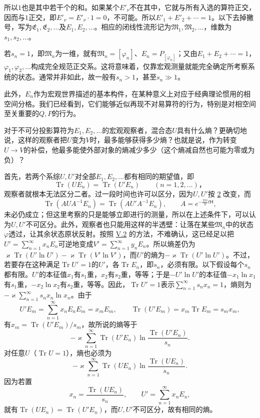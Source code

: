 \documentclass[fontsize=13pt,twoside,openany,headings=normal,parskip=false,bookmarkpackage=false,DIV=calc]{scrbook}
\begin{document}
所以$1$也是其中若干个的和。如果某个$E'_\nu$不在其中，它就与所有入选的算符正交，因而与$1$正交，即$E'_\nu=E'_\nu\cdot1=0$，不可能。所以$E'_1+E'_2+\cdots=1$。以下去掉撇号，写为$\mathfrak E_1,\allowbreak \mathfrak E_2,\allowbreak \ldots$及$E_1,\allowbreak E_2,\allowbreak \ldots$。相应的闭线性流形记为$\mathfrak M_1,\allowbreak \mathfrak M_2,\allowbreak \ldots$，维数为$s_1,\allowbreak s_2,\allowbreak \ldots$。

若$s_n=1$，即$\mathfrak M_n$为一维，就有$\mathfrak M_n=[\varphi_n]$、$E_n=P_{[\varphi_n]}$；又由$E_1+E_2+\cdots=1$，$\varphi_1,\allowbreak \varphi_2,\allowbreak \ldots$构成完全规范正交系。这将意味着，仅靠宏观测量就能完全确定所考察系统的状态。通常并非如此，故一般有$s_n>1$，甚至$s_n\gg1$。

此外，$E_n$作为宏观世界描述的基本构件，在某种\hypertarget{origpage-219}{}\label{origpage-219}意义上对应于经典理论惯用的相空间分格。我们已经看到，它们能够近似再现不对易算符的行为，特别是对相空间至关重要的$Q,\allowbreak P$的行为。

对于不可分投影算符为$E_1,\allowbreak E_2,\allowbreak \ldots$的宏观观察者，混合态$U$具有什么熵？更确切地说，这样的观察者把$U$变为$V$时，最多能够获得多少熵？也就是说，作为转变$U\to V$的补偿，他最多能使外部对象的熵减少多少（这个熵减自然也可能为零或为负）？

首先，若两个系综$U,\allowbreak U'$对全部$E_1,\allowbreak E_2,\allowbreak \ldots$都有相同的期望值，即
\[
\operatorname{Tr}(UE_n)=\operatorname{Tr}(U'E_n)\qquad(n=1,2,\ldots)\text{，}
\]
观察者就根本无法区分二者。过一段时间也许可以区分，因为$U,\allowbreak U'$按 \hyperref[eq:V.1.2]{2} 改变，而
\[
\operatorname{Tr}(AUA^{-1}E_n)=\operatorname{Tr}(AU'A^{-1}E_n),\qquad
A=e^{-\frac{2\pi i}{h}t\mathsf{H}},
\]
未必仍成立；但这里考察的只是能够立即进行的测量，所以在上述条件下，可以认为$U,\allowbreak U'$不可区分。此外，观察者也只能用这样的半透壁：让落在某些$\mathfrak M_n$中的状态$\varphi$透过，让其余状态原状反射。按照 \hyperref[sec:V.2]{V.2} 的方法，不难确认，这已经足以把$U'=\sum_{n=1}^{\infty}x_nE_n$可逆地变成$V'=\sum_{n=1}^{\infty}y_nE_n$。所以熵差仍为$\varkappa\operatorname{Tr}(U'\ln U')-\varkappa\operatorname{Tr}(V'\ln V')$，而$U'$的熵为$-\varkappa\operatorname{Tr}(U'\ln U')$。不过，若要存在这种满足$\operatorname{Tr}U'=1$的$U'$，各$\operatorname{Tr}E_n$，即$s_n$，必须有限。以下假设每个$s_n$都有限。$U'$的本征值$x_1$有$s_1$重，$x_2$有$s_2$重，等等；于是$-U'\ln U'$的本征值$-x_1\ln x_1$有$s_1$重，$-x_2\ln x_2$有$s_2$重，等等。因此，$\operatorname{Tr}U'=1$表示$\sum_{n=1}^{\infty}s_nx_n=1$，熵则为$-\varkappa\sum_{n=1}^{\infty}s_nx_n\ln x_n$。由于
\[
U'E_m=\sum_{n=1}^{\infty}x_nE_nE_m=x_mE_m,\qquad
\operatorname{Tr}(U'E_m)=x_m\operatorname{Tr}E_m=s_mx_m,
\]
有$x_m=\operatorname{Tr}(U'E_m)/s_m$，故所说的熵等于
\[
-\varkappa\sum_{n=1}^{\infty}\operatorname{Tr}(U'E_n)
\ln\frac{\operatorname{Tr}(U'E_n)}{s_n}.
\]
对任意$U$（$\operatorname{Tr}U=1$），熵也必须为
\[
-\varkappa\sum_{n=1}^{\infty}\operatorname{Tr}(UE_n)
\ln\frac{\operatorname{Tr}(UE_n)}{s_n}.
\]\hypertarget{origpage-220}{}\label{origpage-220}因为若置
\[
x_n=\frac{\operatorname{Tr}(UE_n)}{s_n},\qquad U'=\sum_{n=1}^{\infty}x_nE_n,
\]
就有$\operatorname{Tr}(UE_n)=\operatorname{Tr}(U'E_n)$，而$U,\allowbreak U'$不可区分，故有相同的熵。
\end{document}

